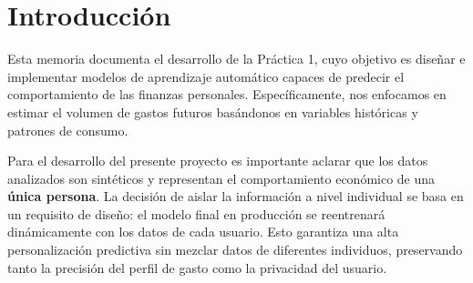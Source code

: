 \section{Introducción}
Esta memoria documenta el desarrollo de la Práctica 1, cuyo objetivo es diseñar e implementar modelos de aprendizaje automático capaces de predecir el comportamiento de las finanzas personales. Específicamente, nos enfocamos en estimar el volumen de gastos futuros basándonos en variables históricas y patrones de consumo.

Para el desarrollo del presente proyecto es importante aclarar que los datos analizados son sintéticos y representan el comportamiento económico de una \textbf{única persona}. La decisión de aislar la información a nivel individual se basa en un requisito de diseño: el modelo final en producción se reentrenará dinámicamente con los datos de cada usuario. Esto garantiza una alta personalización predictiva sin mezclar datos de diferentes individuos, preservando tanto la precisión del perfil de gasto como la privacidad del usuario.
